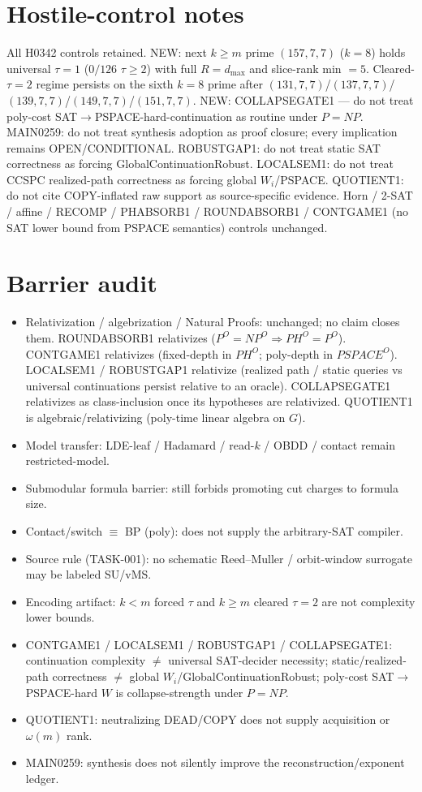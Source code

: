 \documentclass[11pt]{article}
\begin{document}
\section*{Hostile-control notes}
All H0342 controls retained. NEW: next $k{\ge}m$ prime $(157,7,7)$ ($k{=}8$) holds universal
$\tau{=}1$ ($0/126$ $\tau{\ge}2$) with full $R{=}d_{\max}$ and slice-rank min $=5$.
Cleared-$\tau{=}2$ regime persists on the sixth $k{=}8$ prime after
$(131,7,7)$/$(137,7,7)$/$(139,7,7)$/$(149,7,7)$/$(151,7,7)$.
NEW: COLLAPSEGATE1 --- do not treat poly-cost SAT$\to$PSPACE-hard-continuation as routine under $P=NP$.
MAIN0259: do not treat synthesis adoption as proof closure; every implication remains OPEN/CONDITIONAL.
ROBUSTGAP1: do not treat static SAT correctness as forcing GlobalContinuationRobust.
LOCALSEM1: do not treat CCSPC realized-path correctness as forcing global $W_i$/PSPACE.
QUOTIENT1: do not cite COPY-inflated raw support as source-specific evidence. Horn / 2-SAT / affine /
RECOMP / PHABSORB1 / ROUNDABSORB1 / CONTGAME1 (no SAT lower bound from PSPACE semantics)
controls unchanged.

\section*{Barrier audit}
\begin{itemize}
\item Relativization / algebrization / Natural Proofs: unchanged; no claim closes them.
  ROUNDABSORB1 relativizes ($P^O{=}NP^O\Rightarrow PH^O{=}P^O$).
  CONTGAME1 relativizes (fixed-depth in $PH^O$; poly-depth in $PSPACE^O$).
  LOCALSEM1 / ROBUSTGAP1 relativize (realized path / static queries vs universal continuations
  persist relative to an oracle).
  COLLAPSEGATE1 relativizes as class-inclusion once its hypotheses are relativized.
  QUOTIENT1 is algebraic/relativizing (poly-time linear algebra on $G$).
\item Model transfer: LDE-leaf / Hadamard / read-$k$ / OBDD / contact remain restricted-model.
\item Submodular formula barrier: still forbids promoting cut charges to formula size.
\item Contact/switch $\equiv$ BP (poly): does not supply the arbitrary-SAT compiler.
\item Source rule (TASK-001): no schematic Reed--Muller / orbit-window surrogate may be labeled SU/vMS.
\item Encoding artifact: $k{<}m$ forced $\tau$ and $k{\ge}m$ cleared $\tau{=}2$ are not complexity lower bounds.
\item CONTGAME1 / LOCALSEM1 / ROBUSTGAP1 / COLLAPSEGATE1: continuation complexity $\neq$ universal
  SAT-decider necessity; static/realized-path correctness $\neq$ global $W_i$/GlobalContinuationRobust;
  poly-cost SAT$\to$PSPACE-hard $W$ is collapse-strength under $P=NP$.
\item QUOTIENT1: neutralizing DEAD/COPY does not supply acquisition or $\omega(m)$ rank.
\item MAIN0259: synthesis does not silently improve the reconstruction/exponent ledger.
\end{itemize}
\end{document}

